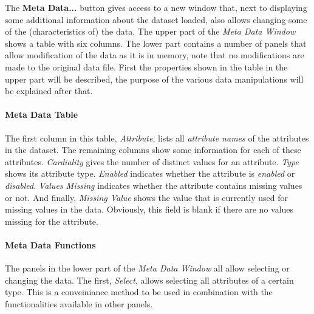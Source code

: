 \documentclass{article}
\begin{document}
The \textbf{Meta Data...} button gives access to a new window that, next to displaying some additional information about the dataset loaded, also allows changing some of the (characteristics of) the data.
The upper part of the \emph{Meta Data Window} shows a table with six columns.
The lower part contains a number of panels that allow modification of the data as it is in memory, note that no modifications are made to the original data file.
First the properties shown in the table in the upper part will be described, the purpose of the various data manipulations will be explained after that.

\paragraph{Meta Data Table}
\label{meta-data-window:meta-data-table}

The first column in this table, \emph{Attribute}, lists all \emph{attribute names} of the attributes in the dataset.
The remaining columns show some information for each of these attributes.
\emph{Cardiality} gives the number of distinct values for an attribute.
\emph{Type} shows its attribute type.
\emph{Enabled} indicates whether the attribute is \emph{enabled} or \emph{disabled}.
\emph{Values Missing} indicates whether the attribute contains missing values or not.
And finally, \emph{Missing Value} shows the value that is currently used for missing values in the data.
Obviously, this field is blank if there are no values missing for the attribute.

\paragraph{Meta Data Functions}
\label{meta-data-window:meta-data-functions}

The panels in the lower part of the \emph{Meta Data Window} all allow selecting or changing the data.
The first, \emph{Select}, allows selecting all attributes of a certain type.
This is a conveiniance method to be used in combination with the functionalities available in other panels.
\end{document}
